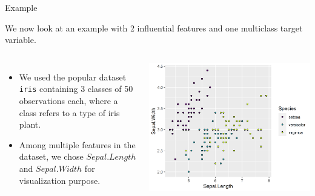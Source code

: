 \begin{vbframe}{Example}
	
	We now look at an example with 2 influential features and one multiclass target variable.
	
	\begin{columns}
		\column{5.5cm}
		\begin{itemize}
			\item We used the popular dataset \texttt{iris} containing 3 classes of 50 observations each, where a class refers to a type of iris plant. 
			\item Among multiple features in the dataset, we chose $Sepal.Length$ and $Sepal.Width$ for visualization purpose.
		\end{itemize}
		\column{4.5cm}
		\begin{center}
			\includegraphics[width=\textwidth]{figure/iris_ds_plot.png}
		\end{center}
		
	\end{columns}
	
	

\end{vbframe}

